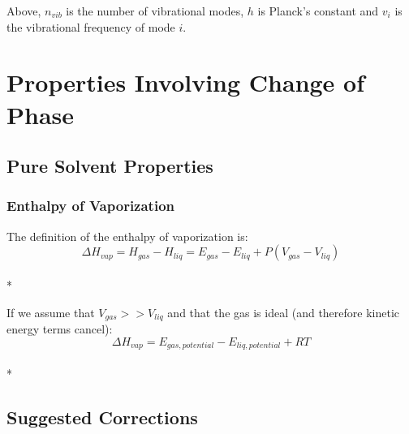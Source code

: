 \documentclass[9pt,bestpractices]{livecoms}
\begin{document}
Above, $n_{vib}$ is the number of vibrational modes, $h$ is Planck's constant and $v_i$ is the vibrational frequency of mode $i$.


\section{Properties Involving Change of Phase}
\subsection{Pure Solvent Properties}
\subsubsection{Enthalpy of Vaporization}

The definition of the enthalpy of vaporization is\cite{hvap}:
\begin{equation}\Delta H_{vap} = H_{gas} - H_{liq} = E_{gas} - E_{liq} + P(V_{gas} - V_{liq})\end{equation}\\*

If we assume that $V_{gas} >> V_{liq}$ and that the gas is ideal (and therefore kinetic energy terms cancel):
\begin{equation}\Delta H_{vap} = E_{gas, potential} - E_{liq, potential} + R T\end{equation}\\*




\subsection{Suggested Corrections}
\end{document}
